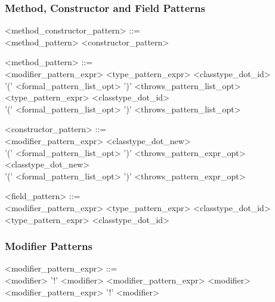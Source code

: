 \subsubsection{Method, Constructor and Field Patterns}
\begin{minipage}{6in}
\begin{blue}
\begin{grammar}
<method_constructor_pattern> ::= \hspace{1in} \\
     <method_pattern>
\alt <constructor_pattern>

<method_pattern> ::= \hspace{1in} \\
     <modifier_pattern_expr> <type_pattern_expr> <classtype_dot_id> \\
     '(' <formal_pattern_list_opt> ')' <throws_pattern_list_opt>
\alt <type_pattern_expr> <classtype_dot_id> \\
     '(' <formal_pattern_list_opt> ')' <throws_pattern_list_opt>

<constructor_pattern> ::= \hspace{1in} \\
     <modifier_pattern_expr> <classtype_dot_new> \\
     '(' <formal_pattern_list_opt> ')' <throws_pattern_expr_opt>
\alt <classtype_dot_new> \\
     '(' <formal_pattern_list_opt> ')' <throws_pattern_expr_opt>

<field_pattern> ::= \hspace{1in} \\
     <modifier_pattern_expr> <type_pattern_expr> <classtype_dot_id>
\alt <type_pattern_expr> <classtype_dot_id>
\end{grammar}
\end{blue}
\end{minipage}

\subsubsection{Modifier Patterns}

\begin{minipage}{6in}
\begin{blue}
\begin{grammar}
<modifier_pattern_expr> ::= \hspace{1in} \\
     {\red <modifier>}
\alt '!' {\red <modifier>}
\alt <modifier_pattern_expr> {\red <modifier>}
\alt <modifier_pattern_expr> '!' {\red <modifier>}
\end{grammar} 
\end{blue}
\end{minipage}

